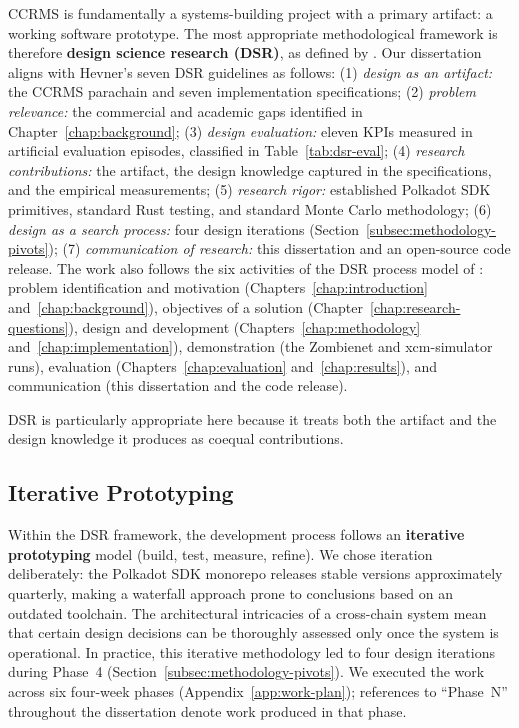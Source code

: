 CCRMS is fundamentally a systems-building project with a primary artifact: a working software prototype. The most appropriate methodological framework is therefore \textbf{design science research (DSR)}, as defined by \citet{hevnerEtAl2004}. Our dissertation aligns with Hevner's seven DSR guidelines as follows: (1) \emph{design as an artifact:} the CCRMS parachain and seven implementation specifications; (2) \emph{problem relevance:} the commercial and academic gaps identified in Chapter~\ref{chap:background}; (3) \emph{design evaluation:} eleven KPIs measured in artificial evaluation episodes, classified in Table~\ref{tab:dsr-eval}; (4) \emph{research contributions:} the artifact, the design knowledge captured in the specifications, and the empirical measurements; (5) \emph{research rigor:} established Polkadot SDK primitives, standard Rust testing, and standard Monte Carlo methodology; (6) \emph{design as a search process:} four design iterations (Section~\ref{subsec:methodology-pivots}); (7) \emph{communication of research:} this dissertation and an open-source code release. The work also follows the six activities of the DSR process model of \citet{peffersEtAl2007}: problem identification and motivation (Chapters~\ref{chap:introduction} and~\ref{chap:background}), objectives of a solution (Chapter~\ref{chap:research-questions}), design and development (Chapters~\ref{chap:methodology} and~\ref{chap:implementation}), demonstration (the Zombienet and xcm-simulator runs), evaluation (Chapters~\ref{chap:evaluation} and~\ref{chap:results}), and communication (this dissertation and the code release).

DSR is particularly appropriate here because it treats both the artifact and the design knowledge it produces as coequal contributions.

\subsection{Iterative Prototyping}\label{subsec:iterative-prototyping}

Within the DSR framework, the development process follows an \textbf{iterative prototyping} model (build, test, measure, refine). We chose iteration deliberately: the Polkadot SDK monorepo releases stable versions approximately quarterly, making a waterfall approach prone to conclusions based on an outdated toolchain. The architectural intricacies of a cross-chain system mean that certain design decisions can be thoroughly assessed only once the system is operational. In practice, this iterative methodology led to four design iterations during Phase~4 (Section~\ref{subsec:methodology-pivots}). We executed the work across six four-week phases (Appendix~\ref{app:work-plan}); references to ``Phase~N'' throughout the dissertation denote work produced in that phase.

